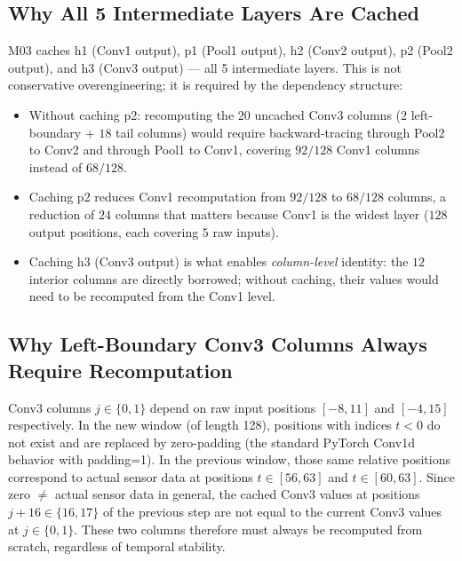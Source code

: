\documentclass[11pt,oneside,a4paper]{report}
\newcommand{\code}[1]{{\small\upshape\ttfamily #1}}
\theoremstyle{remark}
\begin{document}
\subsection{Why All 5 Intermediate Layers Are Cached}
\code{M03} caches \code{h1} (Conv1 output), \code{p1} (Pool1 output), \code{h2} (Conv2 output), \code{p2} (Pool2 output), and \code{h3} (Conv3 output) --- all 5 intermediate layers. This is not conservative overengineering; it is required by the dependency structure:
\begin{itemize}[leftmargin=1.5em]
  \item Without caching \code{p2}: recomputing the $20$ uncached Conv3 columns ($2$ left-boundary + $18$ tail columns) would require backward-tracing through Pool2 to Conv2 and through Pool1 to Conv1, covering $92/128$ Conv1 columns instead of $68/128$.
  \item Caching \code{p2} reduces Conv1 recomputation from $92/128$ to $68/128$ columns, a reduction of $24$ columns that matters because Conv1 is the widest layer ($128$ output positions, each covering $5$ raw inputs).
  \item Caching \code{h3} (Conv3 output) is what enables \emph{column-level} identity: the $12$ interior columns are directly borrowed; without caching, their values would need to be recomputed from the Conv1 level.
\end{itemize}

\subsection{Why Left-Boundary Conv3 Columns Always Require Recomputation}
Conv3 columns $j \in \{0, 1\}$ depend on raw input positions $[-8, 11]$ and $[-4, 15]$ respectively. In the new window (of length 128), positions with indices $t < 0$ do not exist and are replaced by zero-padding (the standard PyTorch Conv1d behavior with \code{padding=1}). In the previous window, those same relative positions correspond to actual sensor data at positions $t \in [56, 63]$ and $t \in [60, 63]$. Since zero $\neq$ actual sensor data in general, the cached Conv3 values at positions $j+16 \in \{16, 17\}$ of the previous step are not equal to the current Conv3 values at $j \in \{0, 1\}$. These two columns therefore must always be recomputed from scratch, regardless of temporal stability.
\end{document}
